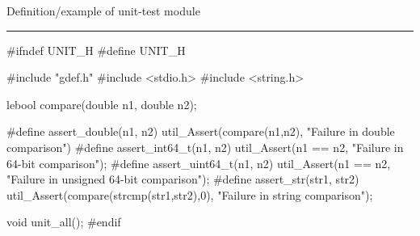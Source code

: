 
Definition/example of unit-test module

\bigskip
\hrule
\code
#ifndef UNIT_H
#define UNIT_H

#include "gdef.h"
#include <stdio.h>
#include <string.h>

lebool compare(double n1, double n2);

#define assert_double(n1, n2) util_Assert(compare(n1,n2), "Failure in double comparison")
#define assert_int64_t(n1, n2) util_Assert(n1 == n2, "Failure in 64-bit comparison");
#define assert_uint64_t(n1, n2) util_Assert(n1 == n2, "Failure in unsigned 64-bit comparison");
#define assert_str(str1, str2) util_Assert(compare(strcmp(str1,str2),0), "Failure in string comparison");
\endcode

\code
void unit_all();
#endif
\endcode
